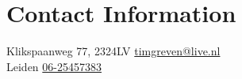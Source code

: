 \section{\sc Contact Information}
Klikspaanweg 77, 2324LV      \hfill \href{mailto:timgreven@live.nl}{timgreven@live.nl}\\
Leiden							 \hfill \href{tel:+31625457383}{06-25457383}\\


